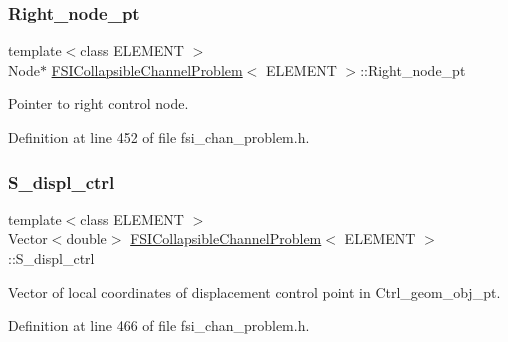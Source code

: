 \subsubsection{\texorpdfstring{Right\+\_\+node\+\_\+pt}{Right\_node\_pt}}
{\footnotesize\ttfamily template$<$class E\+L\+E\+M\+E\+NT $>$ \\
Node$\ast$ \hyperlink{classFSICollapsibleChannelProblem}{F\+S\+I\+Collapsible\+Channel\+Problem}$<$ E\+L\+E\+M\+E\+NT $>$\+::Right\+\_\+node\+\_\+pt\hspace{0.3cm}{\ttfamily [protected]}}



Pointer to right control node. 



Definition at line 452 of file fsi\+\_\+chan\+\_\+problem.\+h.

\mbox{\label{classFSICollapsibleChannelProblem_a203ee0ecb406f97e62b6e7facb8119b5}} 
\subsubsection{\texorpdfstring{S\+\_\+displ\+\_\+ctrl}{S\_displ\_ctrl}}
{\footnotesize\ttfamily template$<$class E\+L\+E\+M\+E\+NT $>$ \\
Vector$<$double$>$ \hyperlink{classFSICollapsibleChannelProblem}{F\+S\+I\+Collapsible\+Channel\+Problem}$<$ E\+L\+E\+M\+E\+NT $>$\+::S\+\_\+displ\+\_\+ctrl\hspace{0.3cm}{\ttfamily [protected]}}



Vector of local coordinates of displacement control point in Ctrl\+\_\+geom\+\_\+obj\+\_\+pt. 



Definition at line 466 of file fsi\+\_\+chan\+\_\+problem.\+h.

\mbox{\label{classFSICollapsibleChannelProblem_a7f21548c86e387a26a55062ef50ea416}} 
